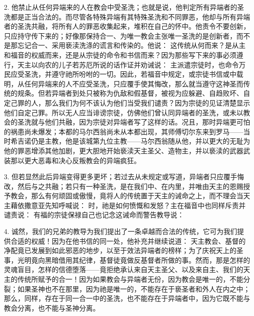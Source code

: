 2. 他禁止从任何异端来的人在教会中受圣洗；也就是说，他判定所有异端者的圣洗都是正当合法的。而尽管各特殊异端有其特殊圣洗和不同罪恶，他却与所有异端者的圣洗共融，将所有人的罪恶收集起来，堆积在自己的怀中。他责令不要创新，只应持守传下来的；好像那保持合一、为唯一教会主张唯一圣洗的是创新者，而不是那忘记合一、采用亵渎洗涤的谎言和传染的。他说： 这传统从何而来？是从主和福音的权威而来，还是从宗徒的命令和书信而来？因为那些写下来的事必须遵行，天主以向农的儿子若苏厄所说的话作证并劝诫说： 主派遣宗徒时，也命令万民应受圣洗，并遵守祂所吩咐的一切。因此，若福音中规定，或宗徒书信或中载明，从任何异端来的人不应受圣洗，只应覆手使其悔改，那么就当遵守这神圣而传统的规条。但若异端者到处只被称为仇敌和假基督，被视为应躲避、自趋败坏、自定己罪的人，那么我们为何不该认为他们当受我们谴责？因为宗徒的见证清楚显示他们自定己罪。所以无人应当诽谤宗徒，仿佛他们曾认同异端者的圣洗，或未以教会的圣洗就与他们共融，因为宗徒对异端者写了这样的话。况且，那时异端更可怕的祸患尚未爆发；本都的马尔西翁尚未从本都出现，其师傅切尔东来到罗马——当时希吉诺仍是主教，他是该城第九位主教——马尔西翁随从他，并以更大的无耻为他的罪恶增添其他加剧，更大胆地开始亵渎天主圣父、造物主，并以亵渎的武器武装那以更大恶毒和决心反叛教会的异端疯狂。\par

3. 但若显然此后异端变得更多更坏；若过去从未规定或写道，异端者只应覆手悔改，然后与之共融；若只有一种圣洗，是在我们中、在内里，并唯由天主的恩赐授予教会，那么有何顽固或傲慢，竟将人的传统置于天主的诫命之上，而不理会当天主藉依撒意亚先知呼喊说： 时，祂是如何愤慨和发怒？主在福音中也同样斥责并谴责说： 有福的宗徒保禄自己也记念这诫命而警告教导说：\par

4. 诚然，我们的兄弟的教导为我们提出了一条卓越而合法的传统，它可为我们提供合适的权威！因为在他书信的同一处，他补充并继续说道： 天主教会、基督的净配竟已发展到如此邪恶的地步，以至于效法异端者的榜样；为了庆祝天上的圣事，光明竟向黑暗借用其纪律，基督徒竟做反基督者所做的事。然而，那是怎样的灵魂盲目，怎样的信德堕落——竟拒绝承认来自天主圣父、以及来自主、我们的天主的传统所赋予的合一！因为如果教会与异端者无份，因为教会是唯一的，不能分裂；如果圣神也不在那里，因为祂是唯一的，不能存在于亵圣者和外人在内之中；那么，同样，存在于同一合一中的圣洗，也不能存在于异端者中，因为它既不能与教会分离，也不能与圣神分离。\par

